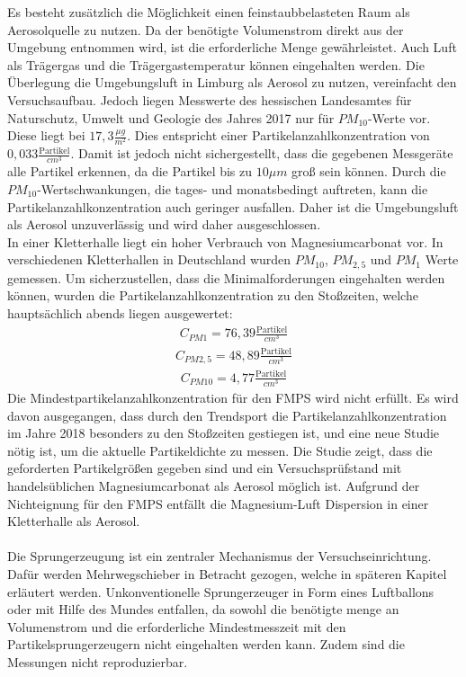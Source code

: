 Es besteht zus\"{a}tzlich die M\"{o}glichkeit einen feinstaubbelasteten Raum als Aerosolquelle zu nutzen. Da der ben\"{o}tigte Volumenstrom direkt aus der Umgebung entnommen wird, ist die erforderliche Menge gew\"{a}hrleistet. Auch Luft als Tr\"{a}gergas und die Tr\"{a}gergastemperatur k\"{o}nnen eingehalten werden. Die \"{U}berlegung die Umgebungsluft in Limburg als Aerosol zu nutzen, vereinfacht den Versuchsaufbau. Jedoch liegen Messwerte des hessischen Landesamtes f\"{u}r Naturschutz, Umwelt und Geologie des Jahres 2017 nur f\"{u}r \(PM_{10}\)-Werte vor. Diese liegt bei \(17,3 \frac{\mu g}{m^2}\). Dies entspricht einer Partikelanzahlkonzentration von \(0,033 \frac{\text{Partikel}}{cm^3}\)\cite{hlnug}. Damit ist jedoch nicht sichergestellt, dass die gegebenen Messger\"{a}te alle Partikel erkennen, da die Partikel bis zu \(10 \mu m\) gro{\ss} sein k\"{o}nnen. Durch die \(PM_{10}\)-Wertschwankungen, die tages- und monatsbedingt auftreten, kann die Partikelanzahlkonzentration auch geringer ausfallen. Daher ist die Umgebungsluft als Aerosol unzuverl\"{a}ssig und wird daher ausgeschlossen.\\
In einer Kletterhalle liegt ein hoher Verbrauch von Magnesiumcarbonat vor. In verschiedenen Kletterhallen in Deutschland wurden \(PM_{10}\), \(PM_{2,5}\) und \(PM_1\) Werte gemessen\cite{exp}. Um sicherzustellen, dass die Minimalforderungen eingehalten werden k\"{o}nnen, wurden die Partikelanzahlkonzentration zu den Sto{\ss}zeiten, welche haupts\"{a}chlich abends liegen ausgewertet:
\begin{align*}
C_{PM 1} = 76,39 \frac{\text{Partikel}}{cm^3}
\end{align*}
\begin{align*}
C_{PM 2,5} = 48,89 \frac{\text{Partikel}}{cm^3}
\end{align*}
\begin{align*}
C_{PM 10} = 4,77 \frac{\text{Partikel}}{cm^3}
\end{align*}
Die Mindestpartikelanzahlkonzentration f\"{u}r den FMPS wird nicht erf\"{u}llt. Es wird davon ausgegangen, dass durch den Trendsport die Partikelanzahlkonzentration im Jahre 2018 besonders zu den Sto{\ss}zeiten gestiegen ist, und eine neue Studie n\"{o}tig ist, um die aktuelle Partikeldichte zu messen. Die Studie zeigt, dass die geforderten Partikelgr\"{o}{\ss}en gegeben sind und ein Versuchspr\"{u}fstand mit handels\"{u}blichen Magnesiumcarbonat als Aerosol m\"{o}glich ist. Aufgrund der Nichteignung f\"{u}r den FMPS entf\"{a}llt die Magnesium-Luft Dispersion in einer Kletterhalle als Aerosol.
\\\\
Die Sprungerzeugung ist ein zentraler Mechanismus der Versuchseinrichtung. Daf\"{u}r werden Mehrwegschieber in Betracht gezogen, welche in sp\"{a}teren Kapitel erl\"{a}utert werden. Unkonventionelle Sprungerzeuger in Form eines Luftballons oder mit Hilfe des Mundes entfallen, da sowohl die ben\"{o}tigte menge an Volumenstrom und die erforderliche Mindestmesszeit mit den Partikelsprungerzeugern nicht eingehalten werden kann. Zudem sind die Messungen nicht reproduzierbar.